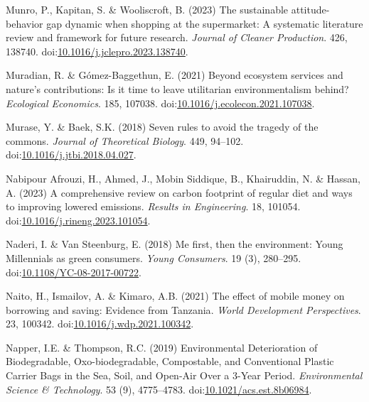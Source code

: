\documentclass[
  letterpaper,
  DIV=11,
  numbers=noendperiod]{scrartcl}
\newlength{\cslhangindent}
\newenvironment{CSLReferences}[2] %
 {\begin{list}{}{%
  \setlength{\itemindent}{0pt}
  \setlength{\leftmargin}{0pt}
  \setlength{\parsep}{0pt}
  \ifodd #1
   \setlength{\leftmargin}{\cslhangindent}
   \setlength{\itemindent}{-1\cslhangindent}
  \fi
  \setlength{\itemsep}{#2\baselineskip}}}
 {\end{list}}
\begin{document}
\begin{CSLReferences}{0}{1}
Munro, P., Kapitan, S. \& Wooliscroft, B. (2023) The sustainable
attitude-behavior gap dynamic when shopping at the supermarket: {A}
systematic literature review and framework for future research.
\emph{Journal of Cleaner Production}. 426, 138740.
doi:\href{https://doi.org/10.1016/j.jclepro.2023.138740}{10.1016/j.jclepro.2023.138740}.

Muradian, R. \& Gómez-Baggethun, E. (2021) Beyond ecosystem services and
nature's contributions: {Is} it time to leave utilitarian
environmentalism behind? \emph{Ecological Economics}. 185, 107038.
doi:\href{https://doi.org/10.1016/j.ecolecon.2021.107038}{10.1016/j.ecolecon.2021.107038}.

Murase, Y. \& Baek, S.K. (2018) Seven rules to avoid the tragedy of the
commons. \emph{Journal of Theoretical Biology}. 449, 94--102.
doi:\href{https://doi.org/10.1016/j.jtbi.2018.04.027}{10.1016/j.jtbi.2018.04.027}.

Nabipour Afrouzi, H., Ahmed, J., Mobin Siddique, B., Khairuddin, N. \&
Hassan, A. (2023) A comprehensive review on carbon footprint of regular
diet and ways to improving lowered emissions. \emph{Results in
Engineering}. 18, 101054.
doi:\href{https://doi.org/10.1016/j.rineng.2023.101054}{10.1016/j.rineng.2023.101054}.

Naderi, I. \& Van Steenburg, E. (2018) Me first, then the environment:
Young {Millennials} as green consumers. \emph{Young Consumers}. 19 (3),
280--295.
doi:\href{https://doi.org/10.1108/YC-08-2017-00722}{10.1108/YC-08-2017-00722}.

Naito, H., Ismailov, A. \& Kimaro, A.B. (2021) The effect of mobile
money on borrowing and saving: {Evidence} from {Tanzania}. \emph{World
Development Perspectives}. 23, 100342.
doi:\href{https://doi.org/10.1016/j.wdp.2021.100342}{10.1016/j.wdp.2021.100342}.

Napper, I.E. \& Thompson, R.C. (2019) Environmental {Deterioration} of
{Biodegradable}, {Oxo-biodegradable}, {Compostable}, and {Conventional
Plastic Carrier Bags} in the {Sea}, {Soil}, and {Open-Air Over} a
3-{Year Period}. \emph{Environmental Science \& Technology}. 53 (9),
4775--4783.
doi:\href{https://doi.org/10.1021/acs.est.8b06984}{10.1021/acs.est.8b06984}.


\end{CSLReferences}
\end{document}
